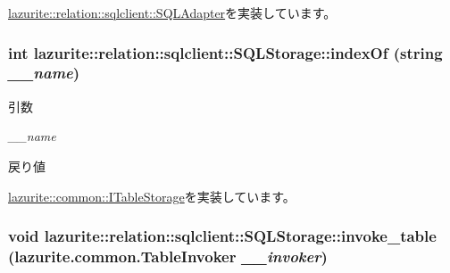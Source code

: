 \hyperlink{interfacelazurite_1_1relation_1_1sqlclient_1_1_s_q_l_adapter_a9749401dc1c4a2334cdb18a5b32f32e9}{lazurite::relation::sqlclient::SQLAdapter}を実装しています。\hypertarget{classlazurite_1_1relation_1_1sqlclient_1_1_s_q_l_storage_a51138a6b8e2e5c1c30b92a0eb02c0550}{
\subsubsection[{indexOf}]{\setlength{\rightskip}{0pt plus 5cm}int lazurite::relation::sqlclient::SQLStorage::indexOf (string {\em \_\-\_\-name})}}
\label{classlazurite_1_1relation_1_1sqlclient_1_1_s_q_l_storage_a51138a6b8e2e5c1c30b92a0eb02c0550}

\begin{DoxyParams}{引数}
\item[{\em \_\-\_\-name}]\end{DoxyParams}
\begin{DoxyReturn}{戻り値}

\end{DoxyReturn}


\hyperlink{interfacelazurite_1_1common_1_1_i_table_storage_af50cc04c6deb3b470182f1f076355526}{lazurite::common::ITableStorage}を実装しています。\hypertarget{classlazurite_1_1relation_1_1sqlclient_1_1_s_q_l_storage_a74de1ca5742b268f8d9bcaadfc88fa0f}{
\subsubsection[{invoke\_\-table}]{\setlength{\rightskip}{0pt plus 5cm}void lazurite::relation::sqlclient::SQLStorage::invoke\_\-table (lazurite.common.TableInvoker {\em \_\-\_\-invoker})}}
\label{classlazurite_1_1relation_1_1sqlclient_1_1_s_q_l_storage_a74de1ca5742b268f8d9bcaadfc88fa0f}

